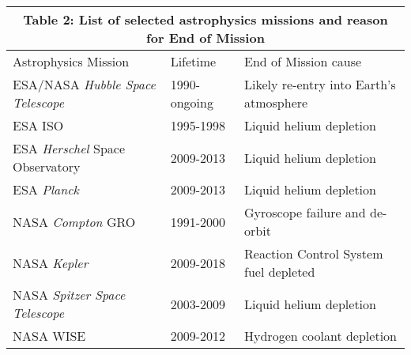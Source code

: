 \documentclass[a4paper,12pt]{article}
\begin{document}
  \begin{table}
\begin{center}
  \begin{tabular}{l l l}
        \multicolumn{3}{c}{Table 2: List of selected astrophysics missions and reason for End of Mission} \\
    \midrule
    Astrophysics Mission   & Lifetime  & End of Mission cause\\
    \midrule
    ESA/NASA \textit{Hubble Space Telescope}   &         1990-ongoing  &  Likely re-entry into Earth's atmosphere\\
    ESA       ISO	                                                   &         1995-1998       &  Liquid helium depletion \\
    ESA    \textit{Herschel} Space Observatory     &         2009-2013	& Liquid helium depletion \\
    ESA     \textit{Planck}	                                   &         2009-2013	& Liquid helium depletion \\ %
    NASA  \textit{Compton} GRO                         &  1991-2000        & Gyroscope failure and de-orbit \\ %
    NASA  \textit{Kepler}                                              & 2009-2018 &  Reaction Control System fuel depleted \\
    NASA  \textit{Spitzer Space Telescope} &2003-2009 & Liquid helium depletion \\
    NASA WISE                                        &2009-2012 & Hydrogen coolant depletion \\
    \bottomrule
      \end{tabular}
\label{tab:space_missions}
  \end{center}
  \end{table}

    \vspace{-38pt}


    
\end{document}
